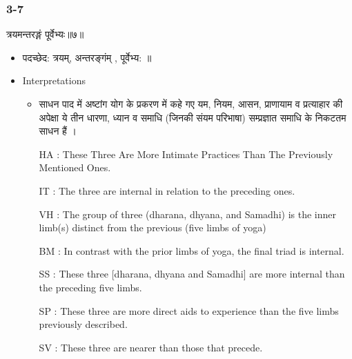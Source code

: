 \begin{frame}[fragile]\frametitle{3-7}
\begin{sanskrit}
त्रयमन्तरङ्गं पूर्वेभ्यः॥७॥
\end{sanskrit}

	\begin{itemize}
	\item पदच्छेद: त्रयम्, अन्तरङ्गंम् , पूर्वेभ्य: ॥
	\item Interpretations
		\begin{itemize}	
		\item साधन पाद में अष्टांग योग के प्रकरण में कहे गए यम, नियम, आसन, प्राणायाम व प्रत्याहार की अपेक्षा ये तीन धारणा, ध्यान व समाधि (जिनकी संयम परिभाषा) सम्प्रज्ञात समाधि के निकटतम साधन हैं ।
		\item [HA]: These Three Are More Intimate Practices Than The Previously Mentioned Ones.
		\item [IT]: The three are internal in relation to the preceding ones.
		\item [VH]: The group of three (dharana, dhyana, and Samadhi) is the inner limb(s) distinct from the previous (five limbs of yoga)
		\item [BM]: In contrast with the prior limbs of yoga, the final triad is internal.
		\item [SS]: These three [dharana, dhyana and Samadhi] are more internal than the preceding five limbs.
		\item [SP]: These three are more direct aids to experience than the five limbs previously described.
		\item [SV]: These three are nearer than those that precede. 
		\end{itemize}
	\end{itemize}
\end{frame}


